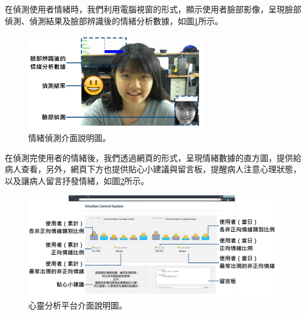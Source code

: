 \documentclass[12pt]{scrreprt}
\begin{document}
在偵測使用者情緒時，我們利用電腦視窗的形式，顯示使用者臉部影像，呈現臉部偵測、偵測結果及臉部辨識後的情緒分析數據，如圖\ref{fig:UserInterface-1}所示。
\begin{figure}[!h]
\begin{center}
\includegraphics[width=0.7\textwidth]{./figs/DetectResult-2.pdf}
\end{center}
\caption{情緒偵測介面說明圖。}
\label{fig:UserInterface-1}
\end{figure}

在偵測完使用者的情緒後，我們透過網頁的形式，呈現情緒數據的直方圖，提供給病人查看，另外，網頁下方也提供貼心小建議與留言板，提醒病人注意心理狀態，以及讓病人留言抒發情緒，如圖\ref{fig:UserInterface-2}所示。

\begin{figure}[!h]
\begin{center}
\includegraphics[width=1\textwidth]{./figs/Web.pdf}
\end{center}
\caption{心靈分析平台介面說明圖。}
\label{fig:UserInterface-2}
\end{figure}
\end{document}
